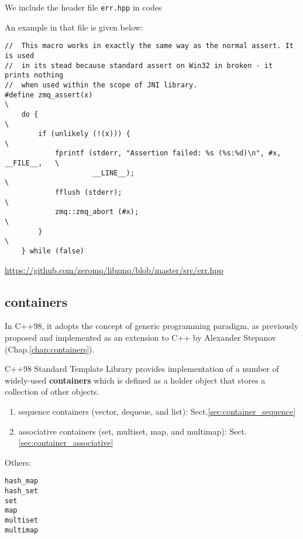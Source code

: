 We include the header file \verb!err.hpp! in codes

An example in that file is given below:

\begin{verbatim}
//  This macro works in exactly the same way as the normal assert. It is used
//  in its stead because standard assert on Win32 in broken - it prints nothing
//  when used within the scope of JNI library.
#define zmq_assert(x)                                                          \
    do {                                                                       \
        if (unlikely (!(x))) {                                                 \
            fprintf (stderr, "Assertion failed: %s (%s:%d)\n", #x, __FILE__,   \
                     __LINE__);                                                \
            fflush (stderr);                                                   \
            zmq::zmq_abort (#x);                                               \
        }                                                                      \
    } while (false)

\end{verbatim}
\url{https://github.com/zeromq/libzmq/blob/master/src/err.hpp}



\subsection{containers}
\label{sec:C++98_containers}
\label{sec:containers_C++98}

In C++98, it adopts the concept of generic programming paradigm, as previously
proposed and implemented as an extension to C++ by Alexander Stepanov
(Chap.\ref{chap:containers}). 

C++98 Standard Template Library provides implementation of a number of widely-used
{\bf containers} which is defined as a holder object that stores a collection of
other objects.

\begin{enumerate}
  
  \item sequence containers (vector, dequeue, and list): Sect.\ref{sec:container_sequence}
  
  \item associative containers (set, multiset, map, and multimap):
  Sect.\ref{sec:container_associative}
\end{enumerate}

Others:
\begin{verbatim}
hash_map
hash_set
set
map
multiset
multimap
\end{verbatim}  

